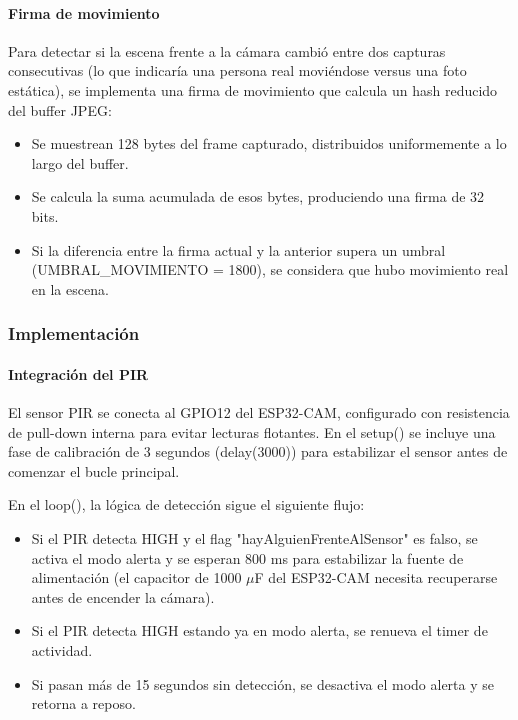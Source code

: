\paragraph{Firma de movimiento}

Para detectar si la escena frente a la cámara cambió entre dos capturas consecutivas (lo que indicaría una persona real moviéndose versus una foto estática), se implementa una firma de movimiento que calcula un hash reducido del buffer JPEG:

\begin{itemize}
    \item Se muestrean 128 bytes del frame capturado, distribuidos uniformemente a lo largo del buffer.
    \item Se calcula la suma acumulada de esos bytes, produciendo una firma de 32 bits.
    \item Si la diferencia entre la firma actual y la anterior supera un umbral (UMBRAL\_MOVIMIENTO = 1800), se considera que hubo movimiento real en la escena.
\end{itemize}

\subsubsection{Implementación}

\paragraph{Integración del PIR}

El sensor PIR se conecta al GPIO12 del ESP32-CAM, configurado con resistencia de pull-down interna para evitar lecturas flotantes. En el setup() se incluye una fase de calibración de 3 segundos (delay(3000)) para estabilizar el sensor antes de comenzar el bucle principal.

En el loop(), la lógica de detección sigue el siguiente flujo:

\begin{itemize}
    \item Si el PIR detecta HIGH y el flag "hayAlguienFrenteAlSensor" es falso, se activa el modo alerta y se esperan 800 ms para estabilizar la fuente de alimentación (el capacitor de 1000 $\mu$F del ESP32-CAM necesita recuperarse antes de encender la cámara).
    \item Si el PIR detecta HIGH estando ya en modo alerta, se renueva el timer de actividad.
    \item Si pasan más de 15 segundos sin detección, se desactiva el modo alerta y se retorna a reposo.
\end{itemize}

